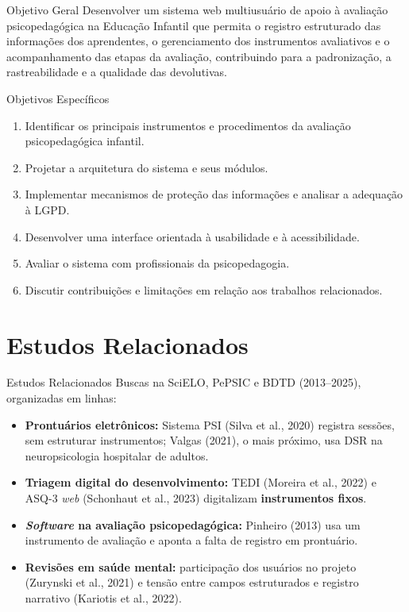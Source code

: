 \documentclass[compress]{beamer}
\begin{document}
\begin{frame}{Objetivo Geral}
Desenvolver um sistema web multiusuário de apoio à avaliação psicopedagógica na Educação Infantil que permita o registro estruturado das informações dos aprendentes, o gerenciamento dos instrumentos avaliativos e o acompanhamento das etapas da avaliação, contribuindo para a padronização, a rastreabilidade e a qualidade das devolutivas.
\end{frame}

\begin{frame}{Objetivos Específicos}
\begin{enumerate}
    \small
    \item Identificar os principais instrumentos e procedimentos da avaliação psicopedagógica infantil.
    \item Projetar a arquitetura do sistema e seus módulos.
    \item Implementar mecanismos de proteção das informações e analisar a adequação à LGPD.
    \item Desenvolver uma interface orientada à usabilidade e à acessibilidade.
    \item Avaliar o sistema com profissionais da psicopedagogia.
    \item Discutir contribuições e limitações em relação aos trabalhos relacionados.
\end{enumerate}
\end{frame}

\section{Estudos Relacionados}

\begin{frame}{Estudos Relacionados}
Buscas na SciELO, PePSIC e BDTD (2013--2025), organizadas em linhas:
\begin{itemize}
    \small
    \item \textbf{Prontuários eletrônicos:} Sistema PSI (Silva et al., 2020) registra sessões, sem estruturar instrumentos; Valgas (2021), o mais próximo, usa DSR na neuropsicologia hospitalar de adultos.
    \item \textbf{Triagem digital do desenvolvimento:} TEDI (Moreira et al., 2022) e ASQ-3 \textit{web} (Schonhaut et al., 2023) digitalizam \textbf{instrumentos fixos}.
    \item \textbf{\textit{Software} na avaliação psicopedagógica:} Pinheiro (2013) usa um instrumento de avaliação e aponta a falta de registro em prontuário.
    \item \textbf{Revisões em saúde mental:} participação dos usuários no projeto (Zurynski et al., 2021) e tensão entre campos estruturados e registro narrativo (Kariotis et al., 2022).
\end{itemize}
\end{frame}
\end{document}
